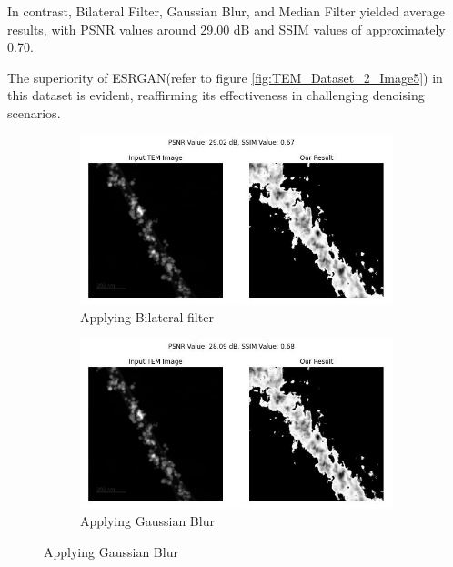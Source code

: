 In contrast, Bilateral Filter, Gaussian Blur, and Median Filter yielded average results, with PSNR values around 29.00 dB and SSIM values of approximately 0.70.

\vspace{10pt}

The superiority of ESRGAN(refer to figure \ref{fig:TEM_Dataset_2_Image5}) in this dataset is evident, reaffirming its effectiveness in challenging denoising scenarios.



\begin{figure}[H]
    \centering
    \begin{subfigure}{.47\textwidth} %
        \includegraphics[width=\textwidth]{img/Results/Dataset_2/Dataset_2_bilateral_filter.jpg}
        \caption{Applying Bilateral filter}
        \label{fig:Image1}
    \end{subfigure}
    \hfill
    \begin{subfigure}{.47\textwidth} %
        \includegraphics[width=\textwidth]{img/Results/Dataset_2/Dataset_2_gaussian_blur.jpg}
        \caption{Applying Gaussian Blur}
        \label{fig:Image2}
    \end{subfigure}
    

\end{figure}
